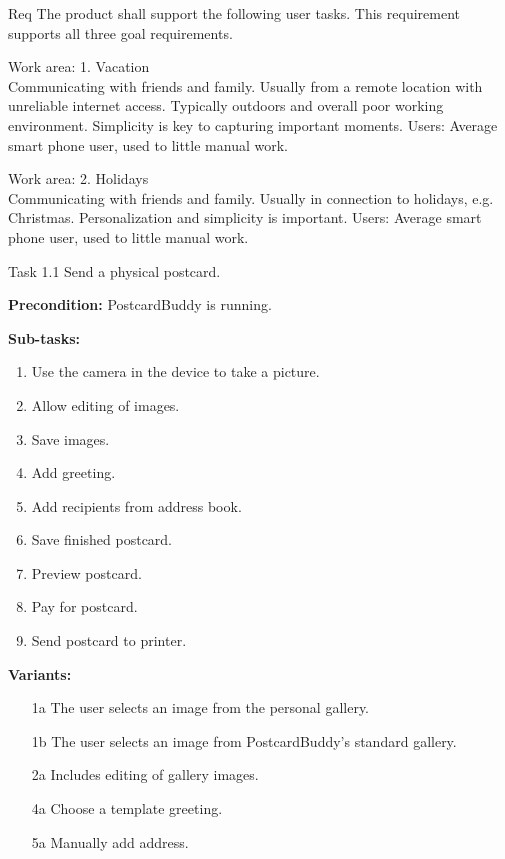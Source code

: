 \documentclass[10pt,a4paper]{article}
\begin{document}
\begin {description}

\item [Req \thesubsubsection {.\thetasks}] The product shall support the following user tasks. This requirement supports all three goal requirements.

\item[Work area: 1. Vacation] \mbox{}\\
Communicating with friends and family. Usually from a remote location with unreliable internet access. Typically outdoors and overall poor working environment. Simplicity is key to capturing important moments. \newline
Users: Average smart phone user, used to little manual work. 

\item[Work area: 2. Holidays] \mbox{}\\
Communicating with friends and family. Usually in connection to holidays, e.g. Christmas. Personalization and simplicity is important.
 \newline
Users: Average smart phone user, used to little manual work.

\item [Task 1.1] Send a physical postcard.
\begin {description}
\item \textbf{Precondition:} PostcardBuddy is running.

\item \textbf{Sub-tasks:}
\begin{enumerate}
\item Use the camera in the device to take a picture.
\item Allow editing of images.
\item Save images.
\item Add greeting.
\item Add recipients from address book. 
\item Save finished postcard.
\item Preview postcard.
\item Pay for postcard.
\item Send postcard to printer.
\end{enumerate}

\item \textbf{Variants:}
\begin{itemize}[label={}]
\item[1a] The user selects an image from the personal gallery.
\item[1b] The user selects an image from PostcardBuddy's standard gallery. 
\item[2a] Includes editing of gallery images.
\item[4a] Choose a template greeting.
\item[5a] Manually add address.
\end{itemize}
\end{description}


\end{description}
\end{document}
